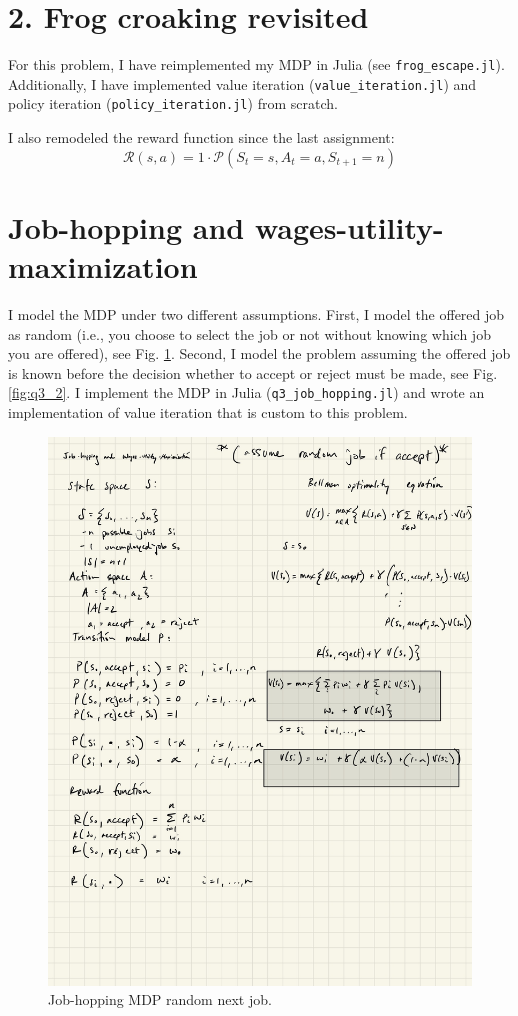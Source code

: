 \documentclass[12pt]{article}
\begin{document}
\clearpage
\section*{2. Frog croaking revisited}
For this problem, I have reimplemented my MDP in Julia (see \texttt{frog\_escape.jl}). Additionally, I have implemented value iteration (\texttt{value\_iteration.jl}) and policy iteration (\texttt{policy\_iteration.jl}) from scratch.

I also remodeled the reward function since the last assignment:
$$\mathcal{R}(s, a) = 1 \cdot \mathcal{P}(S_t = s, A_t = a, S_{t+1} = n)$$


\section*{Job-hopping and wages-utility-maximization}
I model the MDP under two different assumptions. First, I model the offered job as random (i.e., you choose to select the job or not without knowing which job you are offered), see Fig. \ref{fig:q3_1}. Second, I model the problem assuming the offered job is known before the decision whether to accept or reject must be made, see Fig. \ref{fig:q3_2}. I implement the MDP in Julia (\texttt{q3\_job\_hopping.jl}) and wrote an implementation of value iteration that is custom to this problem.

\begin{figure}[h]
	\centering
	\includegraphics[width=.5\textwidth]{ipad/q3_1.jpg}
	\caption{Job-hopping MDP random next job.}
	\label{fig:q3_1}
\end{figure}
\end{document}
